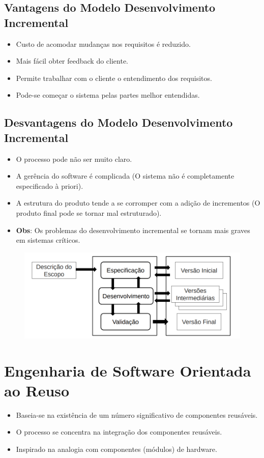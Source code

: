 \documentclass[a4paper, 11pt]{article}
\begin{document}
\subsection{Vantagens do Modelo Desenvolvimento Incremental}
\begin{itemize}
    \item Custo de acomodar mudanças nos requisitos é reduzido.
    \item Mais fácil obter feedback do cliente.
    \item Permite trabalhar com o cliente o entendimento dos requisitos.
    \item Pode-se começar o sistema pelas partes melhor entendidas.
\end{itemize}

\subsection{Desvantagens do Modelo Desenvolvimento Incremental}
\begin{itemize}
    \item O processo pode não ser muito claro.
    \item A gerência do software é complicada (O sistema não é completamente especificado à priori).
    \item A estrutura do produto tende a se corromper com a adição de incrementos (O produto final pode se tornar mal estruturado).
    \item \textbf{Obs}: Os problemas do desenvolvimento incremental se tornam mais graves em sistemas críticos.
\end{itemize}

\begin{figure}[h]
    \includegraphics[width=14cm]{modelo_desenv_incremental}
    \centering
\end{figure}
\newpage


\section{Engenharia de Software Orientada ao Reuso}
\begin{itemize}
    \item Baseia-se na existência de um número significativo de componentes reusáveis.
    \item O processo se concentra na integração dos componentes reusáveis.
    \item Inspirado na analogia com componentes (módulos) de hardware.
\end{itemize}
\end{document}
